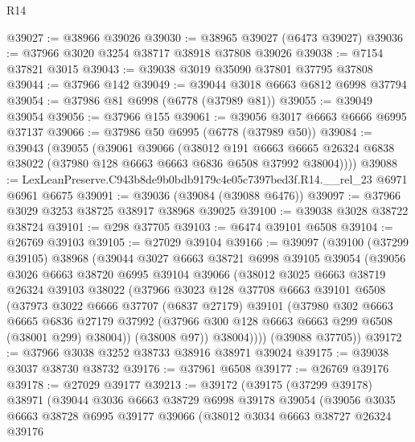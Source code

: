 \begin{lexlean}{R14}
\begin{coremodule}
@39027 := @38966 @39026
@39030 := @38965 @39027 (@6473 @39027)
@39036 := @37966 @3020 @3254 @38717 @38918 @37808 @39026
@39038 := @7154 @37821 @3015
@39043 := @39038 @3019 @35090 @37801 @37795 @37808
@39044 := @37966 @142
@39049 := @39044 @3018 @6663 @6812 @6998 @37794
@39054 := @37986 @81 @6998 (@6778 (@37989 @81))
@39055 := @39049 @39054
@39056 := @37966 @155
@39061 := @39056 @3017 @6663 @6666 @6995 @37137
@39066 := @37986 @50 @6995 (@6778 (@37989 @50))
@39084 := @39043
    (@39055
      (@39061
        @39066
        (@38012
          @191
          @6663
          @6665
          @26324
          @6838
          @38022
          (@37980 @128 @6663 @6663 @6836 @6508 @37992 @38004))))
@39088 := LexLeanPreserve.C943b8de9b0bdb9179c4e05c7397bed3f.R14.__rel_23 @6971 @6961 @6675
@39091 := @39036 (@39084 (@39088 @6476))
@39097 := @37966 @3029 @3253 @38725 @38917 @38968 @39025
@39100 := @39038 @3028 @38722 @38724
@39101 := @298 @37705
@39103 := @6474 @39101 @6508
@39104 := @26769 @39103
@39105 := @27029 @39104
@39166 := @39097
    (@39100
      (@37299 @39105)
      @38968
      (@39044
        @3027
        @6663
        @38721
        @6998
        @39105
        @39054
        (@39056
          @3026
          @6663
          @38720
          @6995
          @39104
          @39066
          (@38012
            @3025
            @6663
            @38719
            @26324
            @39103
            @38022
            (@37966
              @3023
              @128
              @37708
              @6663
              @39101
              @6508
              (@37973
                @3022
                @6666
                @37707
                (@6837 @27179)
                @39101
                (@37980
                  @302
                  @6663
                  @6665
                  @6836
                  @27179
                  @37992
                  (@37966 @300 @128 @6663 @6663 @299 @6508 (@38001 @299) @38004))
                (@38008 @97))
              @38004))))
      (@39088 @37705))
@39172 := @37966 @3038 @3252 @38733 @38916 @38971 @39024
@39175 := @39038 @3037 @38730 @38732
@39176 := @37961 @6508
@39177 := @26769 @39176
@39178 := @27029 @39177
@39213 := @39172
    (@39175
      (@37299 @39178)
      @38971
      (@39044
        @3036
        @6663
        @38729
        @6998
        @39178
        @39054
        (@39056
          @3035
          @6663
          @38728
          @6995
          @39177
          @39066
          (@38012
            @3034
            @6663
            @38727
            @26324
            @39176

\end{coremodule}
\end{lexlean}
